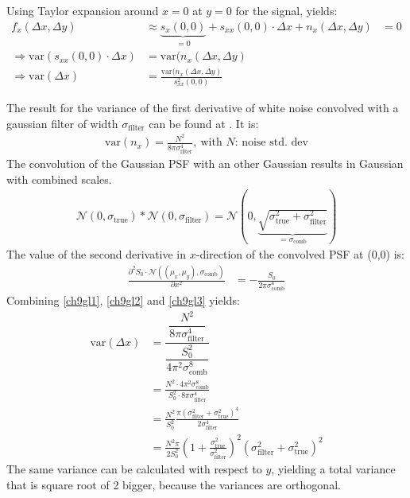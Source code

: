 Using Taylor expansion around $x = 0$ at $y= 0$ for the signal, yields:
\begin{align}
f_x(\Delta x, \Delta y)&\approx \underbrace{s_x(0, 0)}_{=0} + s_{xx}(0, 0)\cdot \Delta x + n_x(\Delta x, \Delta y)&=0\\
\Rightarrow \text{var}(s_{xx}(0, 0)\cdot \Delta x)&= \text{var}(n_x(\Delta x,\Delta y)\\
\Rightarrow \text{var}(\Delta x) &= \frac{\text{var}(n_x(\Delta x, \Delta y)}{s_{xx}^2(0, 0)} \label{ch9gl1}
\end{align}

The result for the variance of the first derivative of white noise convolved with a gaussian filter of width $\sigma_\text{filter}$ can be found at \cite{ulli}. It is:
\begin{align}
	\text{var}(n_x) = \frac{N^2}{8\pi\sigma_\text{filter}^4},~\text{with }N\text{: noise std. dev} \label{ch9gl2}
\end{align}
The convolution of the Gaussian PSF  with an other Gaussian results in Gaussian with combined scales.
\begin{align}
 \mathcal{N}(0,\sigma_\text{true}) \ast \mathcal{N}(0,\sigma_\text{filter}) = \mathcal{N}\left(0,\underbrace{\sqrt{\sigma_\text{true}^2+\sigma_\text{filter}^2}}_{=\sigma_\text{comb}}\right)
\end{align}
The value of the second derivative in $x$-direction of the convolved PSF at (0,0) is:
\begin{align}
 \frac{\partial^2 S_0\cdot\mathcal{N}\left((\mu_x,\mu_y),\sigma_\text{comb}\right)}{\partial x^2}  &=  -\frac{S_0}{2\pi \sigma_\text{comb}^4}  \label{ch9gl3}
\end{align}
Combining \ref{ch9gl1}, \ref{ch9gl2} and \ref{ch9gl3} yields:
\begin{align}
\text{var}\left(\Delta x\right) &= \dfrac{\dfrac{N^2}{8\pi\sigma_\text{filter}^4}}{\dfrac{S_0^2}{4\pi^2 \sigma_\text{comb}^8}}\\
&= \frac{N^2\cdot 4\pi^2 \sigma_\text{comb}^8}{S_0^2\cdot8\pi\sigma_\text{filter}^4}\\
&= \frac{N^2}{S_0^2} \frac{\pi \left(\sigma_\text{filter}^2+\sigma_\text{true}^2\right)^4}{2\sigma_\text{filter}^4}\\
&= \frac{N^2\pi}{2S_0^2} \left(1+\frac{\sigma_\text{true}^2}{\sigma_\text{filter}^2}\right)^2\left(\sigma_\text{filter}^2+\sigma_\text{true}^2\right)^2 
\end{align}
The same variance can be calculated with respect to $y$, yielding a total variance that is square root of 2 bigger, because the variances are orthogonal.
